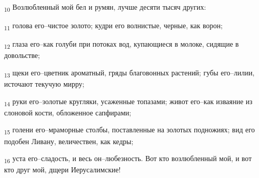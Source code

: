 \begin{tcolorbox}
\textsubscript{10} Возлюбленный мой бел и румян, лучше десяти тысяч других:
\end{tcolorbox}
\begin{tcolorbox}
\textsubscript{11} голова его--чистое золото; кудри его волнистые, черные, как ворон;
\end{tcolorbox}
\begin{tcolorbox}
\textsubscript{12} глаза его--как голуби при потоках вод, купающиеся в молоке, сидящие в довольстве;
\end{tcolorbox}
\begin{tcolorbox}
\textsubscript{13} щеки его--цветник ароматный, гряды благовонных растений; губы его--лилии, источают текучую мирру;
\end{tcolorbox}
\begin{tcolorbox}
\textsubscript{14} руки его--золотые кругляки, усаженные топазами; живот его--как изваяние из слоновой кости, обложенное сапфирами;
\end{tcolorbox}
\begin{tcolorbox}
\textsubscript{15} голени его--мраморные столбы, поставленные на золотых подножиях; вид его подобен Ливану, величествен, как кедры;
\end{tcolorbox}
\begin{tcolorbox}
\textsubscript{16} уста его--сладость, и весь он--любезность. Вот кто возлюбленный мой, и вот кто друг мой, дщери Иерусалимские!
\end{tcolorbox}
